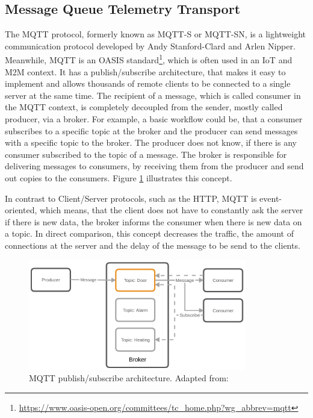 \subsection{Message Queue Telemetry Transport}
\label{section:MQTT}
The \ac{MQTT} protocol, formerly known as MQTT-S or MQTT-SN, is a lightweight communication protocol developed by Andy Stanford-Clard and Arlen Nipper.\autocite[cf.]{MQTT:FAQ}
Meanwhile, \ac{MQTT} is an \ac{OASIS} standard\footnote{\url{https://www.oasis-open.org/committees/tc_home.php?wg_abbrev=mqtt}}, which is often used in an \ac{IoT} and \ac{M2M} context.\autocite[cf.][p. 5]{lampkin:2012:mqtt}
It has a publish/subscribe architecture, that makes it easy to implement and allows thousands of remote clients to be connected to a single server at the same time.\autocite[cf.][p. 5]{lampkin:2012:mqtt}
The recipient of a message, which is called consumer in the \ac{MQTT} context, is completely decoupled from the sender, mostly called producer, via a broker.
For example, a basic workflow could be, that a consumer subscribes to a specific topic at the broker and the producer can send messages with a specific topic to the broker.
The producer does not know, if there is any consumer subscribed to the topic of a message.
The broker is responsible for delivering messages to consumers, by receiving them from the producer and send out copies to the consumers.
Figure \ref{fig:mqtt_architecture} illustrates this concept.

In contrast to Client/Server protocols, such as the \acs{HTTP}, \ac{MQTT} is event-oriented, which means, that the client does not have to constantly ask the server if there is new data, the broker informs the consumer when there is new data on a topic.\autocite[cf.]{Bayer:MQTT}
In direct comparison, this concept decreases the traffic, the amount of connections at the server and the delay of the message to be send to the clients.

\begin{figure}[H]
    \centering
    \includegraphics[width=0.85\textwidth]{resources/images/mqtt_architecture.png}
    \caption[MQTT publish/subscribe architecture]{MQTT publish/subscribe architecture. Adapted from: \autocite{Bayer:MQTT}}
    \label{fig:mqtt_architecture}
\end{figure}

